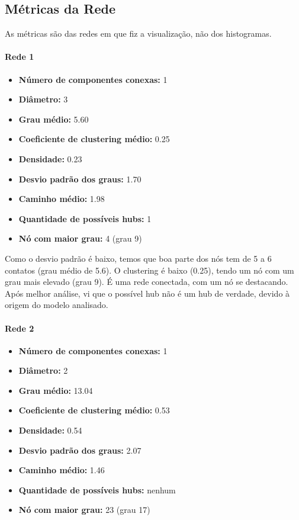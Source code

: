 \documentclass[a4paper]{article}
\begin{document}
\subsection*{Métricas da Rede}

As métricas são das redes em que fiz a visualização, não dos histogramas.
\paragraph{Rede 1}
\begin{itemize}
    \item \textbf{Número de componentes conexas:} 1
    \item \textbf{Diâmetro:} 3
    \item \textbf{Grau médio:} 5.60
    \item \textbf{Coeficiente de clustering médio:} 0.25
    \item \textbf{Densidade:} 0.23
    \item \textbf{Desvio padrão dos graus:} 1.70
    \item \textbf{Caminho médio:} 1.98
    \item \textbf{Quantidade de possíveis hubs:} 1
    \item \textbf{Nó com maior grau:} 4 (grau 9)
\end{itemize}

Como o desvio padrão é baixo, temos que boa parte dos nós tem de 5 a 6 contatos (grau médio de 5.6). O clustering é baixo (0.25), tendo um nó com um grau mais elevado (grau 9). É uma rede conectada, com um nó se destacando. Após melhor análise, vi que o possível hub não é um hub de verdade, devido à origem do modelo analisado.

\paragraph{Rede 2}
\begin{itemize}
    \item \textbf{Número de componentes conexas:} 1
    \item \textbf{Diâmetro:} 2
    \item \textbf{Grau médio:} 13.04
    \item \textbf{Coeficiente de clustering médio:} 0.53
    \item \textbf{Densidade:} 0.54
    \item \textbf{Desvio padrão dos graus:} 2.07
    \item \textbf{Caminho médio:} 1.46
    \item \textbf{Quantidade de possíveis hubs:} nenhum
    \item \textbf{Nó com maior grau:} 23 (grau 17)
\end{itemize}
\end{document}
